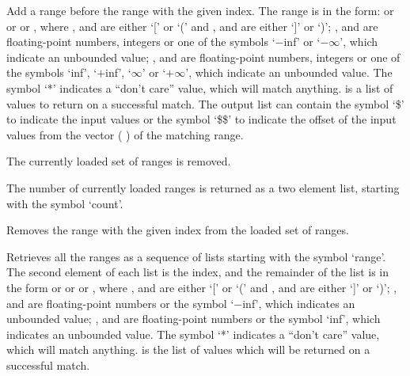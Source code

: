   Add a range before the range with the given index.
  The range is in the form:  or   or   or , where
  ,  and  are either `[' or `(' and ,  and  are
  either `]' or `)';
  ,  and  are floating-point numbers, integers or one of the symbols `$-$inf' or
  `$-\infty$', which indicate an unbounded value;
  ,  and  are floating-point numbers, integers or one of the symbols `inf', `$+$inf',
  `$\infty$' or `$+\infty$', which indicate an unbounded value.
  The symbol `*' indicates a ``don't care'' value, which will match anything.
   is a list of values to return on a successful match.
  The output list can contain the symbol `\$' to indicate the input values or the symbol `\$\$' to
  indicate the offset of the input values from the vector (  ) of the
  matching range.

  The currently loaded set of ranges is removed.
  
  The number of currently loaded ranges is returned as a two element list, starting with the symbol
  `count'.
  
  Removes the range with the given index from the loaded set of ranges.

  Retrieves all the ranges as a sequence of lists starting with the symbol `range'.
  The second element of each list is the index, and the remainder of the list is in the form
   or   or   or , where ,  and 
  are either `[' or `(' and ,  and  are either `]' or `)';
  ,  and  are floating-point numbers or the symbol `$-$inf',
  which indicates an unbounded value; ,  and  are floating-point numbers or
  the symbol `inf', which indicates an unbounded value.
  The symbol `*' indicates a ``don't care'' value, which will match anything.
   is the list of values which will be returned on a successful match.

